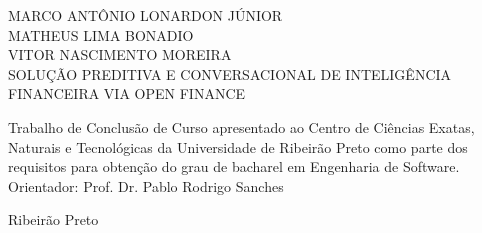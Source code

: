 \newpage
\begin{titlepage}
    \begin{center}
        \fontsize{12pt}{12pt}\selectfont MARCO ANTÔNIO LONARDON JÚNIOR\\
        \fontsize{12pt}{12pt}\selectfont MATHEUS LIMA BONADIO\\
        \fontsize{12pt}{12pt}\selectfont VITOR NASCIMENTO MOREIRA\\
        \vspace{4cm}
        \fontsize{14pt}{14pt}\selectfont SOLUÇÃO PREDITIVA E CONVERSACIONAL DE INTELIGÊNCIA FINANCEIRA VIA OPEN FINANCE
        \vspace{4cm}
        \begin{flushright}
            \parbox{8cm}{
                \fontsize{12pt}{12pt}\selectfont
                Trabalho de Conclusão de Curso apresentado ao Centro de Ciências Exatas, Naturais e Tecnológicas da Universidade de Ribeirão Preto como parte dos requisitos para obtenção do grau de bacharel em Engenharia de Software.\\[12pt]
                Orientador: Prof. Dr. Pablo Rodrigo Sanches
            }
        \end{flushright}
        \vfill
        \fontsize{12pt}{12pt}\selectfont Ribeirão Preto\\
        \fontsize{12pt}{12pt}
    \end{center}
\end{titlepage}
